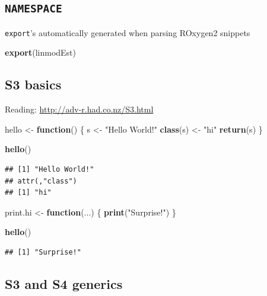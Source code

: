 \documentclass[]{book}
\newenvironment{Shaded}{\begin{snugshade}}{\end{snugshade}}
\newcommand{\KeywordTok}[1]{\textcolor[rgb]{0.13,0.29,0.53}{\textbf{#1}}}
\newcommand{\StringTok}[1]{\textcolor[rgb]{0.31,0.60,0.02}{#1}}
\newcommand{\ControlFlowTok}[1]{\textcolor[rgb]{0.13,0.29,0.53}{\textbf{#1}}}
\newcommand{\NormalTok}[1]{#1}
\theoremstyle{definition}
\theoremstyle{definition}
\theoremstyle{definition}
\theoremstyle{remark}
\begin{document}
\subsection{\texorpdfstring{\texttt{NAMESPACE}}{NAMESPACE}}\label{namespace}

\texttt{export}'s automatically generated when parsing ROxygen2 snippets

\begin{Shaded}
\begin{Highlighting}[]
\KeywordTok{export}\NormalTok{(linmodEst)}
\end{Highlighting}
\end{Shaded}

\subsection{S3 basics}\label{s3-basics}

Reading: \url{http://adv-r.had.co.nz/S3.html}

\begin{Shaded}
\begin{Highlighting}[]
\NormalTok{hello <-}\StringTok{ }\ControlFlowTok{function}\NormalTok{() \{}
\NormalTok{ s <-}\StringTok{ "Hello World!"}
 \KeywordTok{class}\NormalTok{(s) <-}\StringTok{ "hi"}
 \KeywordTok{return}\NormalTok{(s)}
\NormalTok{\}}

\KeywordTok{hello}\NormalTok{()}
\end{Highlighting}
\end{Shaded}

\begin{verbatim}
## [1] "Hello World!"
## attr(,"class")
## [1] "hi"
\end{verbatim}

\begin{Shaded}
\begin{Highlighting}[]
\NormalTok{print.hi <-}\StringTok{ }\ControlFlowTok{function}\NormalTok{(...) \{}
  \KeywordTok{print}\NormalTok{(}\StringTok{"Surprise!"}\NormalTok{)}
\NormalTok{\}}

\KeywordTok{hello}\NormalTok{()}
\end{Highlighting}
\end{Shaded}

\begin{verbatim}
## [1] "Surprise!"
\end{verbatim}

\subsection{S3 and S4 generics}\label{s3-and-s4-generics}
\end{document}
